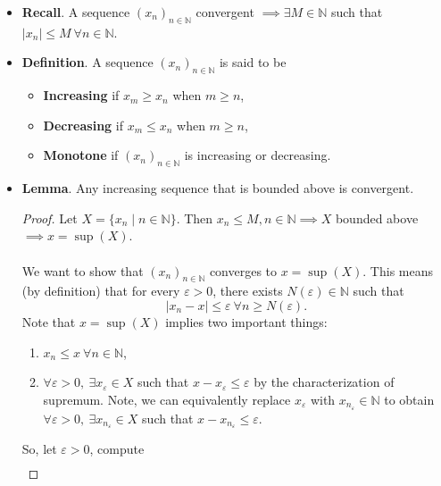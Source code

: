 \documentclass{article}
\newcommand{\N}{\mathbb{N}}
\newcommand{\seq}[2]{(#1_{#2})_{#2 \in \N}}
\newcommand{\set}[2]{\{ #1 \mid #2 \}}
\newcommand{\?}{\stackrel{?}{=}}
\begin{document}
\begin{itemize}
\begin{proof}
        \begin{align*}
            |x_n| &\leq M \qquad n \leq N(1) \\
            |x_n| &\leq M \qquad n \geq N(1) \\
            \implies |x_n| &\leq M \qquad \forall n \in \N.
        \end{align*}
    \end{proof}
    \item \textbf{Recall}. A sequence $(x_n)_{n \in \N}$ convergent $\implies \exists M \in \N$ such that $|x_n| \leq M \ \forall n \in \N$.
    \item \textbf{Definition}. A sequence $\seq{x}{n}$ is said to be
    \begin{itemize}
        \item \textbf{Increasing} if $x_m \geq x_n$ when $m \geq n$,
        \item \textbf{Decreasing} if $x_m \leq x_n$ when $m \geq n$,
        \item \textbf{Monotone} if $\seq{x}{n}$ is increasing or decreasing.
    \end{itemize}
    \item \textbf{Lemma}. Any increasing sequence that is bounded above is convergent.
    \begin{proof}
        Let $X = \set{x_n}{n \in \N}$. Then $x_n \leq M, n \in \N \implies X$ bounded above $\implies x = \sup(X)$. \\\\
        We want to show that $\seq{x}{n}$ converges to $x = \sup(X)$. This means (by definition) that for every $\varepsilon > 0$, there exists $N(\varepsilon) \in \N$ such that
        $$|x_n - x| \leq \varepsilon \ \forall n \geq N(\varepsilon).$$
        Note that $x = \sup(X)$ implies two important things:
        \begin{enumerate}[label=(\roman*)]
            \item $x_n \leq x \ \forall n \in \N$,
            \item $\forall \varepsilon > 0, \ \exists x_\varepsilon \in X$ such that $x - x_\varepsilon \leq \varepsilon$ by the characterization of supremum. Note, we can equivalently replace $x_\varepsilon$ with $x_{n_\varepsilon} \in \N$ to obtain $\forall \varepsilon > 0, \ \exists x_{n_\varepsilon} \in X$ such that $x - x_{n_\varepsilon} \leq \varepsilon$.
        \end{enumerate}
        So, let $\varepsilon > 0$, compute
        \begin{align*}

\end{align*}
\end{proof}
\end{itemize}
\end{document}
